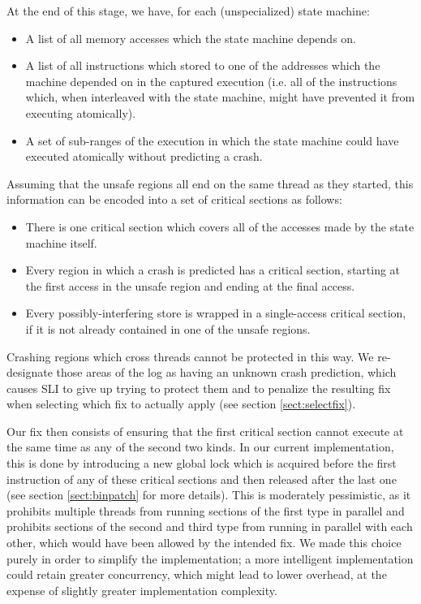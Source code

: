 \documentclass[10pt,twocolumn,preprint,natbib,authoryear]{sigplanconf}
\begin{document}
At the end of this stage, we have, for each (unspecialized) state machine:

\begin{itemize}
\item A list of all memory accesses which the state machine depends
  on.
\item A list of all instructions which stored to one of the addresses
  which the machine depended on in the captured execution (i.e. all of
  the instructions which, when interleaved with the state machine,
  might have prevented it from executing atomically).
\item A set of sub-ranges of the execution in which the state machine
  could have executed atomically without predicting a crash.
\end{itemize}

Assuming that the unsafe regions all end on the same thread as they
started, this information can be encoded into a set of critical
sections as follows:

\begin{itemize}
\item There is one critical section which covers all of the accesses
  made by the state machine itself.
\item Every region in which a crash is predicted has a critical
  section, starting at the first access in the unsafe region and
  ending at the final access.
\item Every possibly-interfering store is wrapped in a single-access
  critical section, if it is not already contained in one of the
  unsafe regions.
\end{itemize}

Crashing regions which cross threads cannot be protected in this way.
We re-designate those areas of the log as having an unknown crash
prediction, which causes SLI to give up trying to protect them and to
penalize the resulting fix when selecting which fix to actually apply
(see section \ref{sect:selectfix}).

Our fix then consists of ensuring that the first critical section
cannot execute at the same time as any of the second two kinds.  In
our current implementation, this is done by introducing a new global
lock which is acquired before the first instruction of any of these
critical sections and then released after the last one (see section
\ref{sect:binpatch} for more details).  This is moderately
pessimistic, as it prohibits multiple threads from running sections of
the first type in parallel and prohibits sections of the second and
third type from running in parallel with each other, which would have
been allowed by the intended fix.  We made this choice purely in order
to simplify the implementation; a more intelligent implementation
could retain greater concurrency, which might lead to lower overhead,
at the expense of slightly greater implementation complexity.
\end{document}
